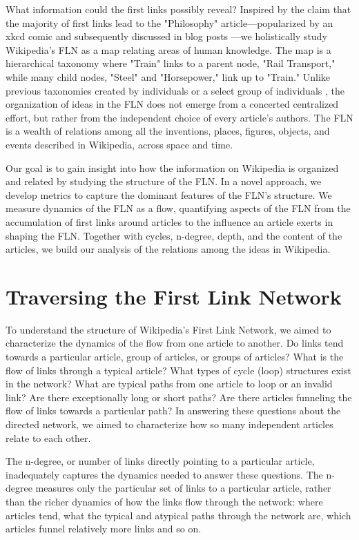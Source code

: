 \documentclass[pre,twocolumn,twoside,superscriptaddress,floatfix, aps, 10pt]{revtex4-1}
\begin{document}
What information could the first links possibly reveal?
Inspired by the claim that the majority of first links lead to the 
"Philosophy" article---popularized by an xkcd comic and subsequently
discussed in blog posts ---we holistically study 
Wikipedia's FLN as a map relating areas of human knowledge. 
The map is a hierarchical taxonomy where "Train" links to a parent node, 
"Rail Transport," while many child nodes, "Steel" and "Horsepower," link up to 
"Train." Unlike previous taxonomies
created by individuals
\cite{locke}
\cite{descartes}
\cite{aristotle} 
or a select group of individuals 
\cite{hist_thesaurus}, 
the organization of ideas in the FLN 
does not emerge from a concerted centralized effort, 
but rather from the independent choice of every article's authors.
The FLN is a wealth of relations among all the inventions, places,
figures, objects, and events described in Wikipedia, across space and time.


Our goal is to gain insight into how the information on Wikipedia is organized and related
by studying the structure of the FLN.
In a novel approach, we develop metrics to capture 
the dominant features of the FLN's structure.
We measure dynamics of the FLN as a flow, quantifying 
aspects of the FLN from the accumulation of first links around articles 
to the influence an article exerts in shaping the FLN.
Together with cycles, n-degree, depth, and the content of the articles, 
we build our analysis of the relations among the ideas in Wikipedia.


\section{Traversing the First Link Network}

To understand the structure of Wikipedia's First Link Network, we
aimed to characterize the dynamics of the flow from one article to another. 
Do links tend towards a particular article, group of articles, or groups of articles? 
What is the flow of links through a typical article?
What types of cycle (loop) structures exist in the network?
What are typical paths from one article to loop or an invalid link? 
Are there exceptionally long or short paths? 
Are there articles funneling the flow of links towards a particular path?
In answering these questions about the directed network, we aimed to characterize 
how so many independent articles relate to each other.


The n-degree, or number of links directly pointing to a particular article,
inadequately captures the dynamics needed to answer these questions.
The n-degree measures only the particular set of links to a particular article, 
rather than the richer dynamics of how the links flow through the network: 
where articles tend, what the typical and atypical 
paths through the network are, which articles funnel relatively more links and so on. 
\end{document}
